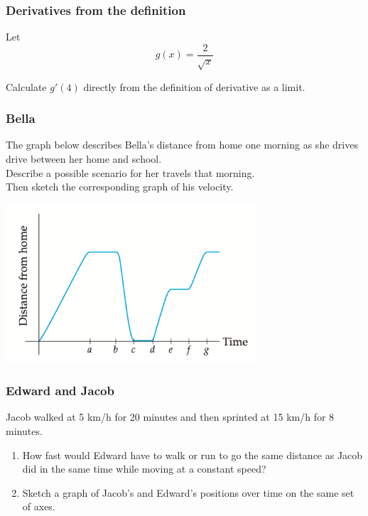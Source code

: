 \documentclass[14pt]{beamer}
\begin{document}
\begin{frame}[t]
	\frametitle{Derivatives from the definition}

	Let
	\[
		g(x) = \frac{2}{\sqrt{x}}
	\]

	Calculate $\displaystyle g'(4)$ directly from the definition of derivative as a
	limit.
\end{frame}

\begin{frame}
	\frametitle{Bella}

	The graph below describes Bella's distance from home one morning as she drives
	drive between her home and school.\\

	Describe a possible scenario for her travels that morning. \\ Then sketch the
	corresponding graph of his velocity.

	\begin{center}
		\includegraphics[width=0.7\textwidth]{G9}
	\end{center}
\end{frame}

\begin{frame}
	\frametitle{Edward and Jacob}

	Jacob walked at 5 km/h for 20 minutes and then sprinted at 15 km/h for 8
	minutes.
	\begin{enumerate}
		\item How fast would Edward have to walk or run to go the same distance as Jacob
			did in the same time while moving at a constant speed?

		\item Sketch a graph of Jacob's and Edward's positions over time on the same
			set of axes.
	\end{enumerate}
\end{frame}
\end{document}
